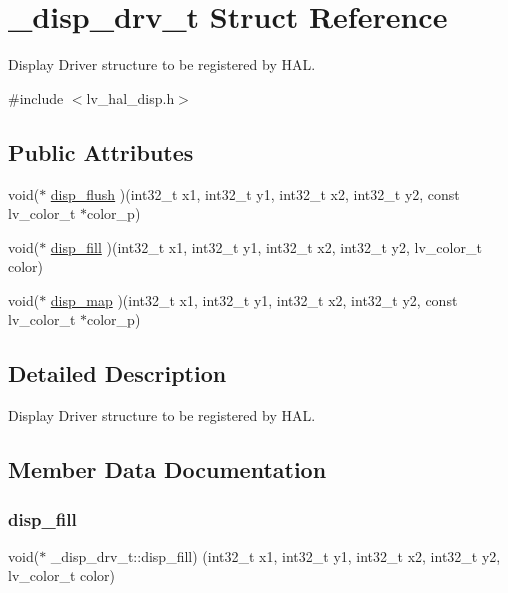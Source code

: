 \hypertarget{struct__disp__drv__t}{}\section{\+\_\+disp\+\_\+drv\+\_\+t Struct Reference}
\label{struct__disp__drv__t}


Display Driver structure to be registered by H\+AL.  




{\ttfamily \#include $<$lv\+\_\+hal\+\_\+disp.\+h$>$}

\subsection*{Public Attributes}
\begin{DoxyCompactItemize}
\item 
void($\ast$ \mbox{\hyperlink{struct__disp__drv__t_a43808fdd9452b66575b20a705af76559}{disp\+\_\+flush}} )(int32\+\_\+t x1, int32\+\_\+t y1, int32\+\_\+t x2, int32\+\_\+t y2, const lv\+\_\+color\+\_\+t $\ast$color\+\_\+p)
\item 
void($\ast$ \mbox{\hyperlink{struct__disp__drv__t_a9a71309dd2e18b2d1c9f27a8750aa551}{disp\+\_\+fill}} )(int32\+\_\+t x1, int32\+\_\+t y1, int32\+\_\+t x2, int32\+\_\+t y2, lv\+\_\+color\+\_\+t color)
\item 
void($\ast$ \mbox{\hyperlink{struct__disp__drv__t_afea4a862de28c974e153c31715efec63}{disp\+\_\+map}} )(int32\+\_\+t x1, int32\+\_\+t y1, int32\+\_\+t x2, int32\+\_\+t y2, const lv\+\_\+color\+\_\+t $\ast$color\+\_\+p)
\end{DoxyCompactItemize}


\subsection{Detailed Description}
Display Driver structure to be registered by H\+AL. 

\subsection{Member Data Documentation}
\mbox{\label{struct__disp__drv__t_a9a71309dd2e18b2d1c9f27a8750aa551}} 
\subsubsection{\texorpdfstring{disp\_fill}{disp\_fill}}
{\footnotesize\ttfamily void($\ast$ \+\_\+disp\+\_\+drv\+\_\+t\+::disp\+\_\+fill) (int32\+\_\+t x1, int32\+\_\+t y1, int32\+\_\+t x2, int32\+\_\+t y2, lv\+\_\+color\+\_\+t color)}

